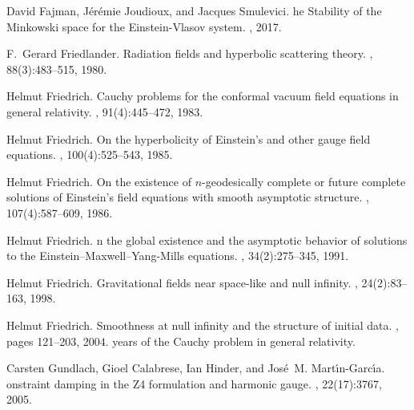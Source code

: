 \documentclass[reqno,11pt,letterpaper]{amsart}
\numberwithin{equation}{section}
\numberwithin{figure}{section}
\theoremstyle{definition}
\theoremstyle{remark}
\begin{document}
\begin{thebibliography}{GCHMG05}
David Fajman, J{\'e}r{\'e}mie Joudioux, and Jacques Smulevici.
he {S}tability of the {M}inkowski space for the
  {E}instein-{V}lasov system.
, 2017.

F.~Gerard Friedlander.
\newblock Radiation fields and hyperbolic scattering theory.
, 88(3):483--515, 1980.

Helmut Friedrich.
\newblock Cauchy problems for the conformal vacuum field equations in general
  relativity.
, 91(4):445--472, 1983.

Helmut Friedrich.
\newblock On the hyperbolicity of {E}instein's and other gauge field equations.
, 100(4):525--543, 1985.

Helmut Friedrich.
\newblock On the existence of {$n$}-geodesically complete or future complete
  solutions of {E}instein's field equations with smooth asymptotic structure.
, 107(4):587--609, 1986.

Helmut Friedrich.
n the global existence and the asymptotic behavior of solutions to
  the {E}instein--{M}axwell--{Y}ang-{M}ills equations.
, 34(2):275--345, 1991.

Helmut Friedrich.
\newblock Gravitational fields near space-like and null infinity.
, 24(2):83--163, 1998.

Helmut Friedrich.
\newblock Smoothness at null infinity and the structure of initial data.
, pages 121--203, 2004.
 years of the Cauchy problem in general relativity.

Carsten Gundlach, Gioel Calabrese, Ian Hinder, and Jos{\'e}~M.
  Mart{\'\i}n-Garc{\'\i}a.
onstraint damping in the {Z}4 formulation and harmonic gauge.
, 22(17):3767, 2005.


\end{thebibliography}
\end{document}
